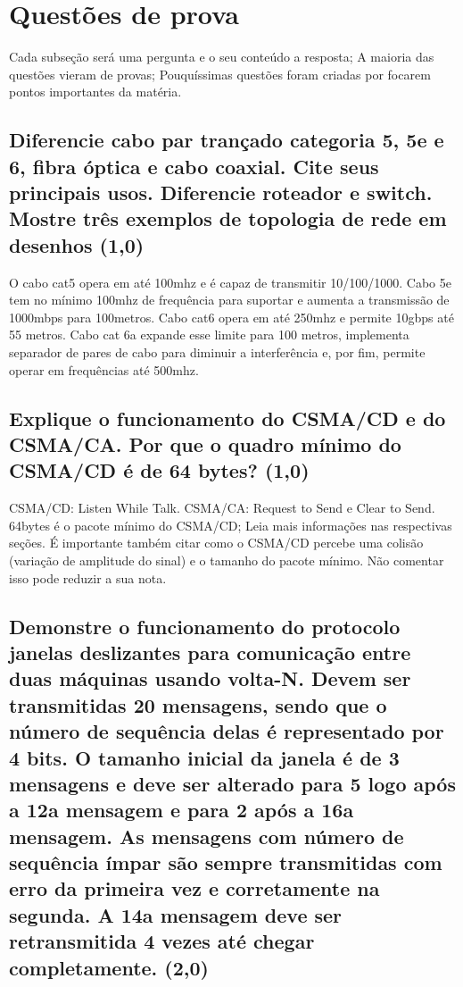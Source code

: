 \documentclass{article}
\begin{document}
\section{Questões de prova}
Cada subseção será uma pergunta e o seu conteúdo a resposta; A maioria das
questões vieram de provas; Pouquíssimas questões foram criadas por focarem
pontos importantes da matéria.

\subsection{Diferencie cabo par trançado categoria 5, 5e e 6, fibra óptica e cabo coaxial. Cite
seus principais usos. Diferencie roteador e switch. Mostre três exemplos de
topologia de rede em desenhos (1,0)}
O cabo cat5 opera em até 100mhz e é capaz de transmitir 10/100/1000. Cabo 5e tem no
mínimo 100mhz de frequência para suportar e aumenta a transmissão de 1000mbps
para 100metros. Cabo cat6 opera em até 250mhz e permite 10gbps até 55 metros.
Cabo cat 6a expande esse limite para 100 metros, implementa separador de pares
de cabo para diminuir a interferência e, por fim, permite operar em frequências
até 500mhz.

\subsection{Explique o funcionamento do CSMA/CD e do CSMA/CA. Por que o quadro mínimo do
CSMA/CD é de 64 bytes? (1,0)}
CSMA/CD: Listen While Talk. CSMA/CA: Request to Send e Clear to Send. 64bytes é
o pacote mínimo do CSMA/CD; Leia mais informações nas respectivas seções. É importante também citar como o CSMA/CD percebe uma colisão (variação de amplitude do sinal) e o tamanho do pacote mínimo. Não comentar isso pode reduzir a sua nota.

\subsection{Demonstre o funcionamento do protocolo janelas deslizantes para comunicação
entre duas máquinas usando volta-N. Devem ser transmitidas 20 mensagens, sendo
que o número de sequência delas é representado por 4 bits. O tamanho inicial da
janela é de 3 mensagens e deve ser alterado para 5 logo após a 12a mensagem e
para 2 após a 16a mensagem. As mensagens com número de sequência ímpar são
sempre transmitidas com erro da primeira vez e corretamente na segunda. A 14a
mensagem deve ser retransmitida 4 vezes até chegar completamente. (2,0)}
\end{document}
